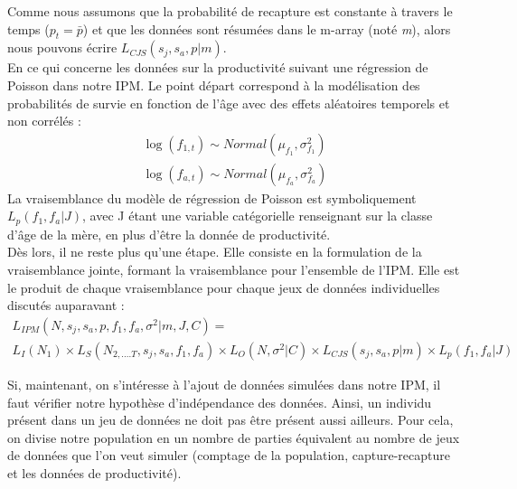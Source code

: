 \documentclass[12pt,a4paper]{article}
\begin{document}
Comme nous assumons que la probabilité de recapture est constante à travers le temps ($p_{t}=\bar{p}$) et que les données sont résumées dans le m-array (noté \textit{m}), alors nous pouvons écrire $L_{CJS}(s_{j}, s_{a}, p|\textit{m})$.\\
En ce qui concerne les données sur la productivité suivant une régression de Poisson dans notre IPM. Le point départ correspond à la modélisation des probabilités de survie en fonction de l'âge avec des effets aléatoires temporels et non corrélés : 
\begin{equation}
\begin{aligned}
\log(f_{1,t})\sim Normal(\mu_{f_1},\sigma^2_{f_1})\\
\log(f_{a,t})\sim Normal(\mu_{f_a},\sigma^2_{f_a})
\end{aligned}
\end{equation}
La vraisemblance du modèle de régression de Poisson est symboliquement $L_{p}(f_{1}, f_{a}|J)$, avec J étant une variable catégorielle renseignant sur la classe d'âge de la mère, en plus d'être la donnée de productivité.
\\
Dès lors, il ne reste plus qu'une étape. Elle consiste en la formulation de la vraisemblance jointe, formant la vraisemblance pour l'ensemble de l'IPM. Elle est le produit de chaque vraisemblance pour chaque jeux de données individuelles discutés auparavant :
\begin{equation}
\begin{aligned}
L_{IPM}(N, s_{j}, s_{a}, p, f_{1}, f_{a}, \sigma^{2}|\textit{m},J,C)= \\
L_{I}(N_{1})\times L_{S}(N_{2,....T}, s_{j}, s_{a}, f_{1}, f_{a})\times L_{O}(N,\sigma^{2}|C)\times L_{CJS}(s_{j}, s_{a}, p|\textit{m})\times L_{p}(f_{1}, f_{a}|J)
\end{aligned}
\end{equation}\vspace*{0,5cm}

Si, maintenant, on s'intéresse à l'ajout de données simulées dans notre IPM, il faut vérifier notre hypothèse d'indépendance des données. Ainsi, un individu présent dans un jeu de données ne doit pas être présent aussi ailleurs. Pour cela, on divise notre population en un nombre de parties équivalent au nombre de jeux de données que l'on veut simuler (comptage de la population, capture-recapture et les données de productivité).
\end{document}
